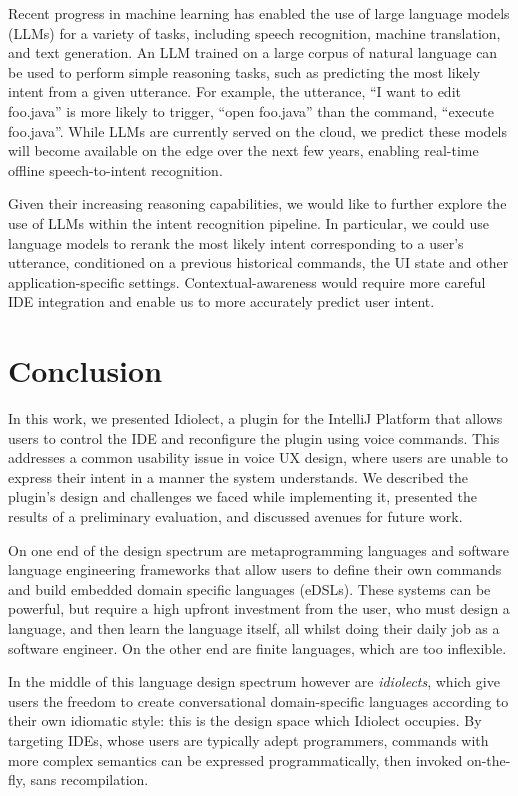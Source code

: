 \documentclass[conference]{IEEEtran}
\begin{document}
Recent progress in machine learning has enabled the use of large language models (LLMs) for a variety of tasks, including speech recognition, machine translation, and text generation. An LLM trained on a large corpus of natural language can be used to perform simple reasoning tasks, such as predicting the most likely intent from a given utterance. For example, the utterance, ``I want to edit foo.java'' is more likely to trigger, ``open foo.java'' than the command, ``execute foo.java''. While LLMs are currently served on the cloud, we predict these models will become available on the edge over the next few years, enabling real-time offline speech-to-intent recognition.

Given their increasing reasoning capabilities, we would like to further explore the use of LLMs within the intent recognition pipeline. In particular, we could use language models to rerank the most likely intent corresponding to a user's utterance, conditioned on a previous historical commands, the UI state and other application-specific settings. Contextual-awareness would require more careful IDE integration and enable us to more accurately predict user intent.

\section{Conclusion}

In this work, we presented Idiolect, a plugin for the IntelliJ Platform that allows users to control the IDE and reconfigure the plugin using voice commands. This addresses a common usability issue in voice UX design, where users are unable to express their intent in a manner the system understands. We described the plugin's design and challenges we faced while implementing it, presented the results of a preliminary evaluation, and discussed avenues for future work.

On one end of the design spectrum are metaprogramming languages and software language engineering frameworks that allow users to define their own commands and build embedded domain specific languages (eDSLs). These systems can be powerful, but require a high upfront investment from the user, who must design a language, and then learn the language itself, all whilst doing their daily job as a software engineer. On the other end are finite languages, which are too inflexible.

In the middle of this language design spectrum however are \textit{idiolects}, which give users the freedom to create conversational domain-specific languages according to their own idiomatic style: this is the design space which Idiolect occupies. By targeting IDEs, whose users are typically adept programmers, commands with more complex semantics can be expressed programmatically, then invoked on-the-fly, sans recompilation.
\end{document}
